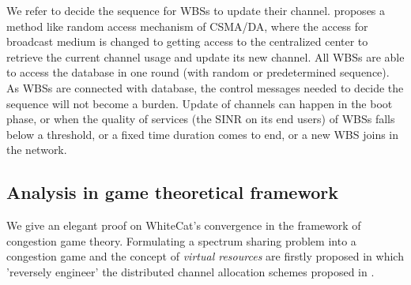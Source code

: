 We refer \cite{CApotentialLearning_05dyspan} to decide the sequence for WBSs to update their channel. \cite{CApotentialLearning_05dyspan} proposes a method like random access mechanism of CSMA/DA, where the access for broadcast medium is changed to getting access to the centralized center to retrieve the current channel usage and update its new channel. All WBSs are able to access the database in one round (with random or predetermined sequence). As WBSs are connected with database, the control messages needed to decide the sequence will not become a burden. Update of channels can happen in the boot phase, or when the quality of services (the SINR on its end users) of WBSs falls below a threshold, or a fixed time duration comes to end, or a new WBS joins in the network. 


\subsection{Analysis in game theoretical framework}
\label{game}
We give an elegant proof on WhiteCat's convergence in the framework of congestion game theory. Formulating a spectrum sharing problem into a congestion game and the concept of \textit{virtual resources} are firstly proposed in \cite{allerton08_liu} which 'reversely engineer' the distributed channel allocation schemes proposed in \cite{babadi_08, Ko_DistributedCA}.

